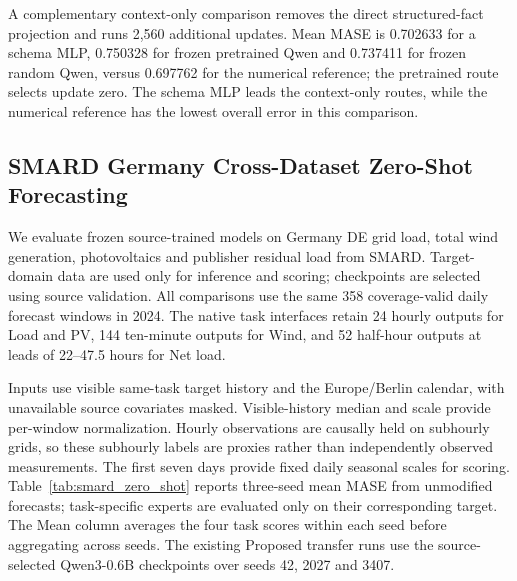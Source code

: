 \documentclass[journal]{IEEEtran}
\begin{document}
A complementary context-only comparison removes the direct structured-fact projection and runs 2,560 additional updates. Mean MASE is 0.702633 for a schema MLP, 0.750328 for frozen pretrained Qwen and 0.737411 for frozen random Qwen, versus 0.697762 for the numerical reference; the pretrained route selects update zero. The schema MLP leads the context-only routes, while the numerical reference has the lowest overall error in this comparison.

\subsection{SMARD Germany Cross-Dataset Zero-Shot Forecasting}
\label{sec:smard_zero_shot}

We evaluate frozen source-trained models on Germany DE grid load, total wind generation, photovoltaics and publisher residual load from SMARD. Target-domain data are used only for inference and scoring; checkpoints are selected using source validation. All comparisons use the same 358 coverage-valid daily forecast windows in 2024. The native task interfaces retain 24 hourly outputs for Load and PV, 144 ten-minute outputs for Wind, and 52 half-hour outputs at leads of 22--47.5 hours for Net load.

Inputs use visible same-task target history and the Europe/Berlin calendar, with unavailable source covariates masked. Visible-history median and scale provide per-window normalization. Hourly observations are causally held on subhourly grids, so these subhourly labels are proxies rather than independently observed measurements. The first seven days provide fixed daily seasonal scales for scoring. Table~\ref{tab:smard_zero_shot} reports three-seed mean MASE from unmodified forecasts; task-specific experts are evaluated only on their corresponding target. The Mean column averages the four task scores within each seed before aggregating across seeds. The existing Proposed transfer runs use the source-selected Qwen3-0.6B checkpoints over seeds 42, 2027 and 3407.
\end{document}
